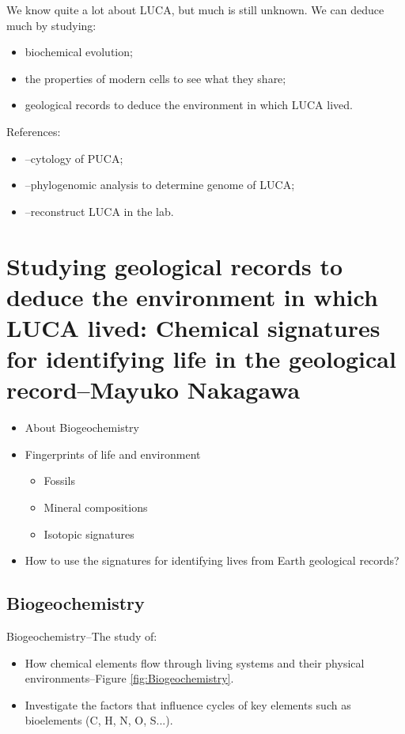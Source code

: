 \documentclass[]{article}
\begin{document}
We know quite a lot about LUCA, but much is still unknown. We can deduce much by studying:
\begin{itemize}
	\item biochemical evolution;
	\item the properties of modern cells to see what they share;
	\item geological records to deduce the environment in which LUCA lived.
\end{itemize}

References:
\begin{itemize}
	\item \cite{penny1999nature}--cytology of PUCA;
	\item \cite{weiss2016physiology}--phylogenomic analysis to determine genome of LUCA;
	\item \cite{torino2013piecing}--reconstruct LUCA in the lab.
\end{itemize}

\section[Deducing the environment in which LUCA lived]{Studying geological records to deduce the environment in which LUCA lived: Chemical signatures for identifying life in the geological record--Mayuko Nakagawa}

\begin{itemize}
	\item About Biogeochemistry
	\item Fingerprints of life and environment
	\begin{itemize}
		\item Fossils
		\item Mineral compositions
		\item Isotopic signatures
	\end{itemize}
	\item How to use the signatures for identifying lives from 	Earth geological records?
\end{itemize}

\subsection{Biogeochemistry}
Biogeochemistry--The study of:
\begin{itemize}
	\item How chemical elements flow through living systems and their physical environments--Figure \ref{fig:Biogeochemistry}.
	\item Investigate the factors that influence cycles of key 	elements such as bioelements (C, H, N, O, S...).
	
\end{itemize}
\end{document}
